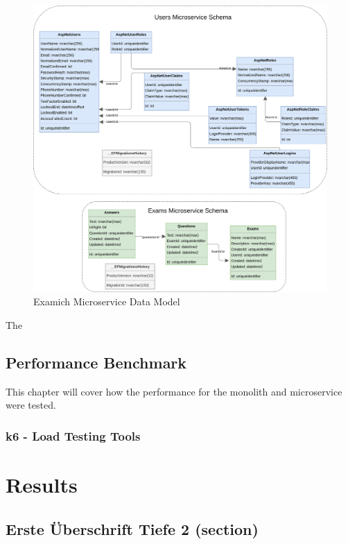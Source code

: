 \documentclass[BIF,Master,nenglish]{twbook}%
\begin{document}
\begin{figure} [H]
 \begin{center}
    \includegraphics[width=1\linewidth]{img/ExamichMicroserviceDataModel.png}
 \end{center}
 \caption{Examich Microservice Data Model}
 \label{datamodelmicroservice}
\end{figure}

The 



\section{Performance Benchmark}
This chapter will cover how the performance for the  monolith and microservice were tested.  

\subsection{k6 - Load Testing Tools}


\chapter{Results}

\section{Erste Überschrift Tiefe 2 (section)}
\end{document}
